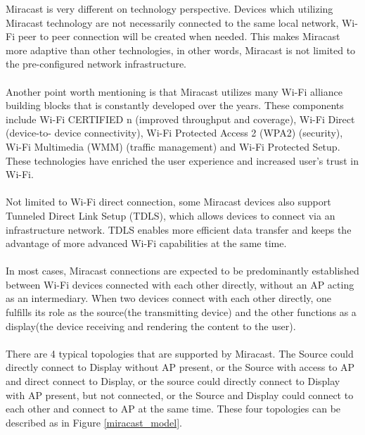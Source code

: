 Miracast \cite{miracast_industry} is very different on technology perspective.
Devices which utilizing Miracast technology are not necessarily connected to
the same local network, Wi-Fi peer to peer connection will be created when
needed. This makes Miracast more adaptive than other technologies, in other
words, Miracast is not limited to the pre-configured network infrastructure.\\
\\
Another point worth mentioning is that Miracast utilizes many Wi-Fi alliance
building blocks that is constantly developed over the years. These components
include Wi-Fi CERTIFIED n (improved throughput and coverage), Wi-Fi Direct
(device-to- device connectivity), Wi-Fi Protected Access 2 (WPA2) (security),
Wi-Fi Multimedia (WMM) (traffic management) and Wi-Fi Protected Setup. These
technologies have enriched the user experience and increased user's trust in
Wi-Fi.\\
\\
Not limited to Wi-Fi direct connection, some Miracast devices also support Tunneled Direct Link Setup (TDLS), which allows devices to connect via an infrastructure network. TDLS enables more efficient data transfer and keeps the advantage of more advanced Wi-Fi capabilities at the same time.\\
\\
In most cases, Miracast connections are expected to be predominantly established between Wi-Fi devices connected with each other directly, without an AP acting as an intermediary. When two devices connect with each other directly, one fulfills its role as the source(the transmitting device) and the other functions as a display(the device receiving and rendering the content to the user).\\
\\
There are 4 typical topologies that are supported by Miracast. The  Source could directly connect to Display without AP present, or the Source with access to AP and direct connect to Display, or the source could directly connect to Display with AP present, but not connected, or the Source and Display could connect to each other and connect to AP at the same time. These four topologies can be described as in Figure  \ref{miracast_model}.

